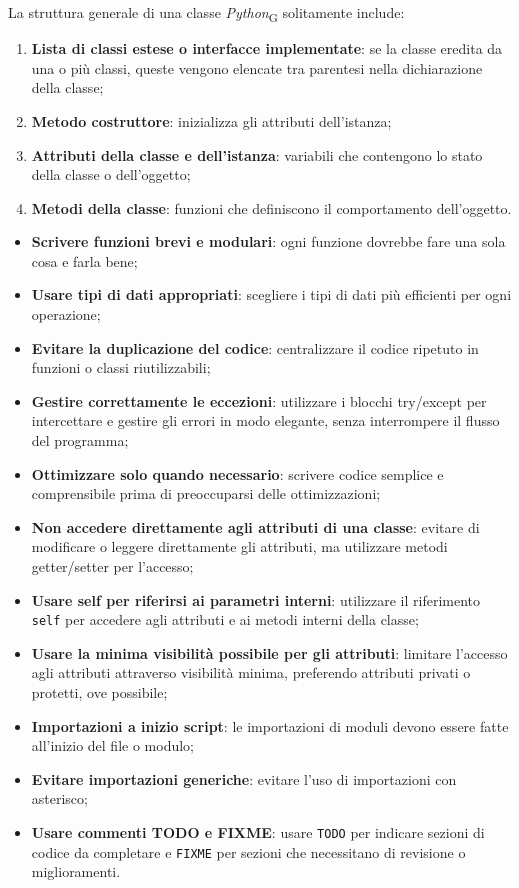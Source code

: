 La struttura generale di una classe \textit{Python}\textsubscript{G} solitamente include:
\begin{enumerate}
    \item \textbf{Lista di classi estese o interfacce implementate}: se la classe eredita da una o più classi, queste vengono elencate tra parentesi nella dichiarazione della classe;
    \item \textbf{Metodo costruttore}: inizializza gli attributi dell'istanza;
    \item \textbf{Attributi della classe e dell'istanza}: variabili che contengono lo stato della classe o dell'oggetto;
    \item \textbf{Metodi della classe}: funzioni che definiscono il comportamento dell'oggetto.
\end{enumerate}

\begin{itemize}
    \item \textbf{Scrivere funzioni brevi e modulari}: ogni funzione dovrebbe fare una sola cosa e farla bene;
    \item \textbf{Usare tipi di dati appropriati}: scegliere i tipi di dati più efficienti per ogni operazione;
    \item \textbf{Evitare la duplicazione del codice}: centralizzare il codice ripetuto in funzioni o classi riutilizzabili;
    \item \textbf{Gestire correttamente le eccezioni}: utilizzare i blocchi try/except per intercettare e gestire gli errori in modo elegante, senza interrompere il flusso del programma;
    \item \textbf{Ottimizzare solo quando necessario}: scrivere codice semplice e comprensibile prima di preoccuparsi delle ottimizzazioni;
    \item \textbf{Non accedere direttamente agli attributi di una classe}: evitare di modificare o leggere direttamente gli attributi, ma utilizzare metodi getter/setter per l'accesso;
    \item \textbf{Usare self per riferirsi ai parametri interni}: utilizzare il riferimento \texttt{self} per accedere agli attributi e ai metodi interni della classe;
    \item \textbf{Usare la minima visibilità possibile per gli attributi}: limitare l'accesso agli attributi attraverso visibilità minima, preferendo attributi privati o protetti, ove possibile;
    \item \textbf{Importazioni a inizio script}: le importazioni di moduli devono essere fatte all'inizio del file o modulo;
    \item \textbf{Evitare importazioni generiche}: evitare l'uso di importazioni con asterisco;
    \item \textbf{Usare commenti TODO e FIXME}: usare \texttt{TODO} per indicare sezioni di codice da completare e \texttt{FIXME} per sezioni che necessitano di revisione o miglioramenti.
\end{itemize}

